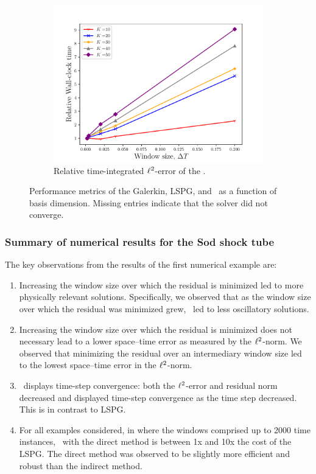 \begin{figure}
\begin{center}
\begin{subfigure}[t]{0.45\textwidth}
\includegraphics[width=1.\linewidth]{figs/sod/converge_walltimes.pdf}
\caption{Relative time-integrated $\ell^2$-error of the \methodAcronymROM.}
\label{fig:sod_error_converge}
\end{subfigure}
\caption{Performance metrics of the Galerkin, LSPG, and \methodAcronymROMs\ as a function of basis dimension. Missing entries indicate that the solver did not converge.} 
\label{fig:convergence_study}
\end{center}
\end{figure}


\subsubsection{Summary of numerical results for the Sod shock tube}
The key observations from the results of the first numerical example are: 
\begin{enumerate}
\item Increasing the window size over which the residual is minimized led to more physically relevant solutions. Specifically, we observed that as the window size over which the residual was minimized grew, \methodAcronym\ led to less oscillatory solutions.
\item Increasing the window size over which the residual is minimized does not necessary lead to a lower space--time error as measured by the $\ell^2$-norm. We observed that minimizing the residual over an intermediary window size led to the lowest space--time error in the $\ell^2$-norm. 
\item \methodAcronym\ displays time-step convergence: both the $\ell^2$-error and residual norm decreased and displayed time-step convergence as the time step decreased. This is in contrast to LSPG.
\item For all examples considered, in where the windows comprised up to 2000 time instances, \methodAcronym\ with the direct method is between 1x and 10x the cost of the LSPG. The 
direct method was observed to be slightly more efficient and robust than the indirect method.
\end{enumerate} 



